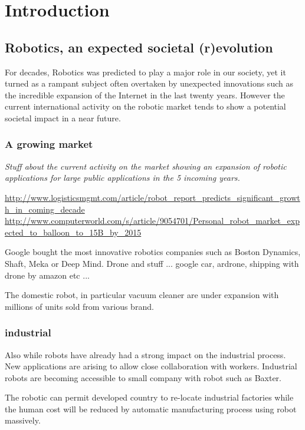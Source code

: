 
\chapter{Introduction} %


\section{Robotics, an expected societal (r)evolution} %

For decades, Robotics was predicted to play a major role in our society, yet it turned as a rampant subject often overtaken by unexpected innovations such as the incredible expansion of the Internet in the last twenty years.
However the current international activity on the robotic market tends to show a potential societal impact in a near future.

\subsection{A growing market} %

\emph{Stuff about the current activity on the market showing an expansion of robotic applications for large public applications in the 5 incoming years.}

\url{http://www.logisticsmgmt.com/article/robot_report_predicts_significant_growth_in_coming_decade}
\url{http://www.computerworld.com/s/article/9054701/Personal_robot_market_expected_to_balloon_to_15B_by_2015}

Google bought the most innovative robotics companies such as Boston Dynamics, Shaft, Meka or Deep Mind.
Drone and stuff ...
google car, ardrone, shipping with drone by amazon etc ...

The domestic robot, in particular vacuum cleaner are under expansion with millions of units sold from various brand.

\subsection{industrial} %
Also while robots have already had a strong impact on the industrial process.
New applications are arising to allow close collaboration with workers.
Industrial robots are becoming accessible to small company with robot such as Baxter.

The robotic can permit developed country to re-locate industrial factories while the human cost will be reduced by automatic manufacturing process using robot massively.


